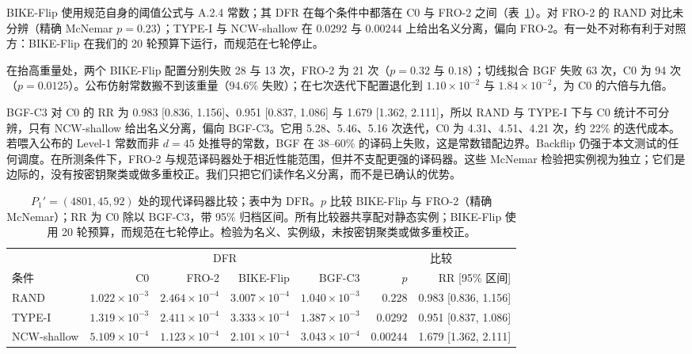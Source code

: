 \documentclass[UTF8,a4paper,10pt,onecolumn]{ctexart}
\begin{document}
BIKE-Flip 使用规范自身的阈值公式与 A.2.4 常数；其 DFR 在每个条件中都落在 C0 与 FRO-2 之间（表~\ref{tab:modern}）。对 FRO-2 的 RAND 对比未分辨（精确 McNemar $p=0.23$）；TYPE-I 与 NCW-shallow 在 $0.0292$ 与 $0.00244$ 上给出名义分离，偏向 FRO-2。有一处不对称有利于对照方：BIKE-Flip 在我们的 20 轮预算下运行，而规范在七轮停止。

在抬高重量处，两个 BIKE-Flip 配置分别失败 28 与 13 次，FRO-2 为 21 次（$p=0.32$ 与 $0.18$）；切线拟合 BGF 失败 63 次，C0 为 94 次（$p=0.0125$）。公布仿射常数搬不到该重量（94.6\% 失败）；在七次迭代下配置退化到 $1.10\times10^{-2}$ 与 $1.84\times10^{-2}$，为 C0 的六倍与九倍。

BGF-C3 对 C0 的 RR 为 0.983 [0.836, 1.156]、0.951 [0.837, 1.086] 与 1.679 [1.362, 2.111]，所以 RAND 与 TYPE-I 下与 C0 统计不可分辨，只有 NCW-shallow 给出名义分离，偏向 BGF-C3。它用 5.28、5.46、5.16 次迭代，C0 为 4.31、4.51、4.21 次，约 22\% 的迭代成本。若喂入公布的 Level-1 常数而非 $d=45$ 处推导的常数，BGF 在 38--60\% 的译码上失败，这是常数错配边界。Backflip 仍强于本文测试的任何调度。在所测条件下，FRO-2 与规范译码器处于相近性能范围，但并不支配更强的译码器。这些 McNemar 检验把实例视为独立；它们是边际的，没有按密钥聚类或做多重校正。我们只把它们读作名义分离，而不是已确认的优势。

\begin{table}[!t]
\centering
\small
\caption{$P_1'=(4801,45,92)$ 处的现代译码器比较；表中为 DFR。$p$ 比较 BIKE-Flip 与 FRO-2（精确 McNemar）；RR 为 C0 除以 BGF-C3，带 95\% 归档区间。所有比较器共享配对静态实例；BIKE-Flip 使用 20 轮预算，而规范在七轮停止。检验为名义、实例级，未按密钥聚类或做多重校正。}
\label{tab:modern}
\begin{tabular}{lrrrrrr}
\toprule
 & \multicolumn{4}{c}{DFR} & \multicolumn{2}{c}{比较} \\
\cmidrule(lr){2-5} \cmidrule(lr){6-7}
条件 & C0 & FRO-2 & BIKE-Flip & BGF-C3 & $p$ & RR [95\% 区间] \\
\midrule
RAND & $1.022\times10^{-3}$ & $2.464\times10^{-4}$ & $3.007\times10^{-4}$ & $1.040\times10^{-3}$ & $0.228$ & 0.983 [0.836, 1.156] \\
TYPE-I & $1.319\times10^{-3}$ & $2.411\times10^{-4}$ & $3.333\times10^{-4}$ & $1.387\times10^{-3}$ & $0.0292$ & 0.951 [0.837, 1.086] \\
NCW-shallow & $5.109\times10^{-4}$ & $1.123\times10^{-4}$ & $2.101\times10^{-4}$ & $3.043\times10^{-4}$ & $0.00244$ & 1.679 [1.362, 2.111] \\
\bottomrule
\end{tabular}
\end{table}
\end{document}
